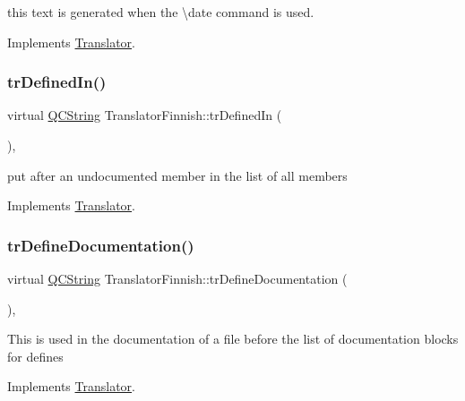 this text is generated when the \textbackslash{}date command is used. 

Implements \mbox{\hyperlink{class_translator}{Translator}}.

\mbox{\label{class_translator_finnish_afdfeab24ab647aab27a2bbc6dd23967b}} 
\subsubsection{\texorpdfstring{trDefinedIn()}{trDefinedIn()}}
{\footnotesize\ttfamily virtual \mbox{\hyperlink{class_q_c_string}{Q\+C\+String}} Translator\+Finnish\+::tr\+Defined\+In (\begin{DoxyParamCaption}{ }\end{DoxyParamCaption})\hspace{0.3cm}{\ttfamily [inline]}, {\ttfamily [virtual]}}

put after an undocumented member in the list of all members 

Implements \mbox{\hyperlink{class_translator}{Translator}}.

\mbox{\label{class_translator_finnish_ae33adbb5d65ee93f16a8beba742edaf9}} 
\subsubsection{\texorpdfstring{trDefineDocumentation()}{trDefineDocumentation()}}
{\footnotesize\ttfamily virtual \mbox{\hyperlink{class_q_c_string}{Q\+C\+String}} Translator\+Finnish\+::tr\+Define\+Documentation (\begin{DoxyParamCaption}{ }\end{DoxyParamCaption})\hspace{0.3cm}{\ttfamily [inline]}, {\ttfamily [virtual]}}

This is used in the documentation of a file before the list of documentation blocks for defines 

Implements \mbox{\hyperlink{class_translator}{Translator}}.

\mbox{\label{class_translator_finnish_a9d7ccaf6a751d883aafc027904eeb61d}} 

